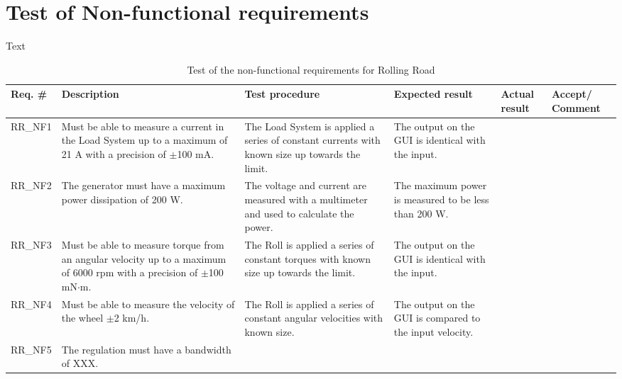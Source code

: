 \section{Test of Non-functional requirements}
Text

\begin{table}[h!]
	\centering
	\label{my-label}
	\begin{tabular}{|p{1.5 cm}|p{2.1 cm}|p{2.1 cm}|p{2.1 cm}|p{2.1 cm}|p{2.1 cm}|}
		\hline
		\textbf{Req. \#} & \textbf{Description} & \textbf{Test procedure} & 
		\textbf{Expected result} & \textbf{Actual result} & \textbf{Accept/ Comment} \\ \hline
		RR\_NF1 
		& Must be able to measure a current in the Load System up to a maximum of 21 A with a precision of $\pm$100 mA.
		& The Load System is applied a series of constant currents with known size up towards the limit.
		& The output on the GUI is identical with the input.
		& 
		& \\ \hline
		RR\_NF2 
		& The generator must have a maximum power dissipation of 200 W.
		& The voltage and current are measured with a multimeter and used to calculate the power.
		& The maximum power is measured to be less than 200 W.
		&
		& \\ \hline
		RR\_NF3 
		& Must be able to measure torque from an angular velocity up to a maximum of 6000 rpm with a precision of $\pm$100 mN$\cdot$m.
		& The Roll is applied a series of constant torques with known size up towards the limit.
		& The output on the GUI is identical with the input.
		& 
		& \\ \hline
		RR\_NF4 
		& Must be able to measure the velocity of the wheel $\pm$2 km/h.
		& The Roll is applied a series of constant angular velocities with known size.
		& The output on the GUI is compared to the input velocity.
		& 
		& \\ \hline
		RR\_NF5 
		& The regulation must have a bandwidth of XXX.
		& 
		& 
		& 
		& \\ \hline
	\end{tabular}
	\caption{Test of the non-functional requirements for Rolling Road}
\end{table}